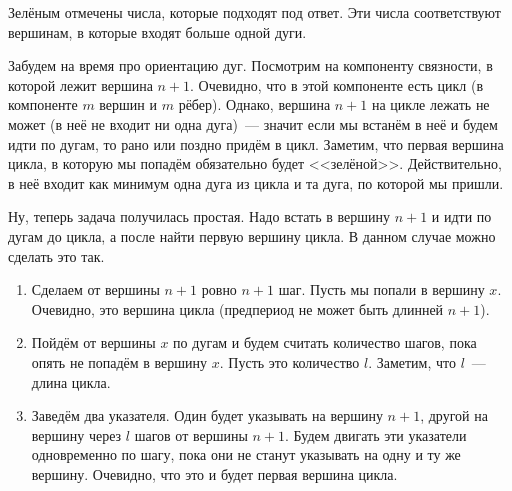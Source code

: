 \documentclass[addpoints]{exam}
\begin{document}
\begin{questions}
\begin{solution}
\begin{center}

\end{center}

Зелёным отмечены числа, которые подходят под ответ. Эти числа соответствуют вершинам, в которые входят больше одной дуги.

Забудем на время про ориентацию дуг. Посмотрим на компоненту связности, в которой лежит вершина $n+1$. Очевидно, что в этой компоненте есть цикл (в компоненте $m$ вершин и $m$ рёбер). Однако, вершина $n+1$ на цикле лежать не может (в неё не входит ни одна дуга)~--- значит если мы встанём в неё и будем идти по дугам, то рано или поздно придём в цикл. Заметим, что первая вершина цикла, в которую мы попадём обязательно будет <<зелёной>>. Действительно, в неё входит как минимум одна дуга из цикла и та дуга, по которой мы пришли.

Ну, теперь задача получилась простая. Надо встать в вершину $n+1$ и идти по дугам до цикла, а после найти первую вершину цикла. В данном случае можно сделать это так.

\begin{enumerate}

\item Сделаем от вершины $n+1$ ровно $n+1$ шаг. Пусть мы попали в вершину $x$. Очевидно, это вершина цикла (предпериод не может быть длинней $n+1$).

\item Пойдём от вершины $x$ по дугам и будем считать количество шагов, пока опять не попадём в вершину $x$. Пусть это количество $l$. Заметим, что $l$~--- длина цикла. 

\item Заведём два указателя. Один будет указывать на вершину $n+1$, другой на вершину через $l$ шагов от вершины $n+1$. Будем двигать эти указатели одновременно по шагу, пока они не станут указывать на одну и ту же вершину. Очевидно, что это и будет первая вершина цикла.

\end{enumerate}

\end{solution}



\end{questions}
\end{document}
